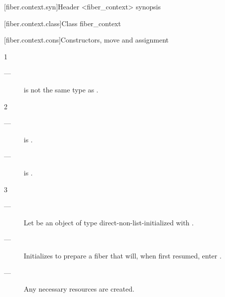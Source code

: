 
[fiber.context.syn]{Header <fiber\_context> synopsis}


[fiber.context.class]{Class fiber\_context}


\newcommand{\state}{\cpp{state}}

[fiber.context.cons]{Constructors, move and assignment}


1 \constraints
\begin{description}
    \item[---]  is not the same type as \fiber.
\end{description}

2 \mandates
\begin{description}
    \item[---]  is \true.
    \item[---]  is \true.
\end{description}

3 \effects
\begin{description}
    \item[---] Let  be an object of
               type  direct-non-list-initialized
               with . 
    \item[---] Initializes  to prepare a fiber that will, when
               first resumed, enter .
    \item[---] Any necessary resources are created. 
\end{description}

